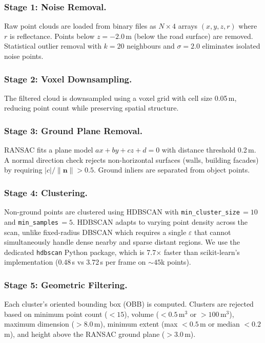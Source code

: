 \documentclass[runningheads]{llncs}
\begin{document}
\subsubsection{Stage 1: Noise Removal.}
Raw point clouds are loaded from binary files as $N \times 4$ arrays $(x, y, z, r)$ where $r$ is reflectance. Points below $z = -2.0$\,m (below the road surface) are removed. Statistical outlier removal with $k = 20$ neighbours and $\sigma = 2.0$ eliminates isolated noise points.

\subsubsection{Stage 2: Voxel Downsampling.}
The filtered cloud is downsampled using a voxel grid with cell size 0.05\,m, reducing point count while preserving spatial structure.

\subsubsection{Stage 3: Ground Plane Removal.}
RANSAC fits a plane model $ax + by + cz + d = 0$ with distance threshold 0.2\,m. A normal direction check rejects non-horizontal surfaces (walls, building facades) by requiring $|c| / \|\mathbf{n}\| > 0.5$. Ground inliers are separated from object points.

\subsubsection{Stage 4: Clustering.}
Non-ground points are clustered using HDBSCAN with \texttt{min\_cluster\_size}$\,= 10$ and \texttt{min\_samples}$\,= 5$. HDBSCAN adapts to varying point density across the scan, unlike fixed-radius DBSCAN which requires a single $\varepsilon$ that cannot simultaneously handle dense nearby and sparse distant regions. We use the dedicated \texttt{hdbscan} Python package, which is 7.7$\times$ faster than scikit-learn's implementation (0.48\,s vs 3.72\,s per frame on ${\sim}45$k points).

\subsubsection{Stage 5: Geometric Filtering.}
Each cluster's oriented bounding box (OBB) is computed. Clusters are rejected based on minimum point count ($< 15$), volume ($< 0.5$\,m$^3$ or $> 100$\,m$^3$), maximum dimension ($> 8.0$\,m), minimum extent (max $< 0.5$\,m or median $< 0.2$\,m), and height above the RANSAC ground plane ($> 3.0$\,m).
\end{document}
